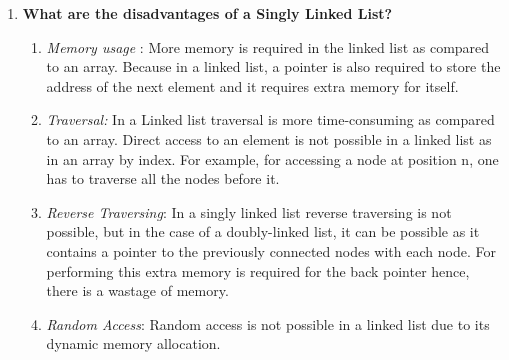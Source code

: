 \documentclass[11pt]{article}
\begin{document}
\begin{enumerate}
\begin{enumerate}
\begin{lstlisting}[language=C]
temp = curr;
prev->next = curr->next;
curr->next = NULL;
free(temp);
					\end{lstlisting}
		      \item Pseudo Code for Searching an Element in a Single Linked List
		            \begin{lstlisting}[language=C]
printf("\nEnter item which you want to search?\n");   
scanf("%d",&item);  
while (ptr!=NULL)  
	if(ptr->data == item)  
		printf("item found at location %d ",i+1);  
		flag=0;  
	else  
		flag=1;  
	i++;  
	ptr = ptr -> next;  
if(flag==1)  
	printf("Item not found\n");  
					\end{lstlisting}
		      \item Pseudo Code for Modifying an Element in a Single Linked List
		            \begin{lstlisting}[language=C]
printf("\nEnter item which you want to Modify?\n");   
scanf("%d",&item);  
printf("\nEnter Modified data?\n");   
scanf("%d",&data_new);  
while (ptr!=NULL)  
	if(ptr->data == item)  
		ptr->data = data_new;
		printf(item modified);  
		flag=0;  
	else  
		flag=1;  
	i++;  
	ptr = ptr -> next;  
if(flag==1)  
	printf("Item not found\n");  
					\end{lstlisting}
	      \end{enumerate}
	\item \textbf{What are the disadvantages of a Singly Linked List?}\\
\begin{enumerate}
	\item \textit{Memory usage}
	: More memory is required in the linked list as compared to an array. Because in a linked list, a pointer is also required to store the address of the next element and it requires extra memory for itself.
	\item \textit{Traversal:} In a Linked list traversal is more time-consuming as compared to an array. Direct access to an element is not possible in a linked list as in an array by index. For example, for accessing a node at position n, one has to traverse all the nodes before it.
	\item \textit{Reverse Traversing}: In a singly linked list reverse traversing is not possible, but in the case of a doubly-linked list, it can be possible as it contains a pointer to the previously connected nodes with each node. For performing this extra memory is required for the back pointer hence, there is a wastage of memory.
	\item \textit{Random Access}: Random access is not possible in a linked list due to its dynamic memory allocation.
	

\end{enumerate}
\end{enumerate}
\end{document}
